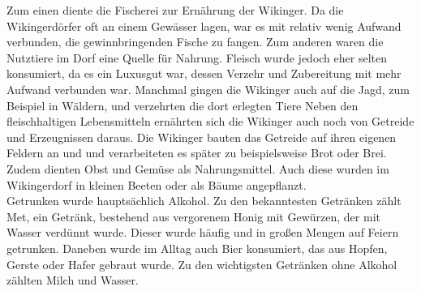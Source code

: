 \documentclass[12pt,a4paper,ngerman,openany]{book}
\begin{document}
Zum einen diente die Fischerei zur Ernährung der Wikinger. Da die Wikingerdörfer oft an einem Gewässer lagen, war es mit relativ wenig Aufwand verbunden, die gewinnbringenden Fische zu fangen. Zum anderen waren die Nutztiere im Dorf eine Quelle für Nahrung. Fleisch wurde jedoch eher selten konsumiert, da es ein Luxusgut war, dessen Verzehr und Zubereitung mit mehr Aufwand verbunden war. Manchmal gingen die Wikinger auch auf die Jagd, zum Beispiel in Wäldern, und verzehrten die dort erlegten Tiere
Neben den fleischhaltigen Lebensmitteln ernährten sich die Wikinger auch noch von Getreide und Erzeugnissen daraus. Die Wikinger bauten das Getreide auf ihren eigenen Feldern an und und verarbeiteten es später zu beispielsweise Brot oder Brei. Zudem dienten Obst und Gemüse als Nahrungsmittel. Auch diese wurden im Wikingerdorf in kleinen Beeten oder als Bäume angepflanzt.\\
Getrunken wurde hauptsächlich Alkohol. Zu den bekanntesten Getränken zählt Met, ein Getränk, bestehend aus vergorenem Honig mit Gewürzen, der mit Wasser verdünnt wurde. Dieser wurde häufig und in großen Mengen auf Feiern getrunken. Daneben wurde im Alltag auch Bier konsumiert, das aus Hopfen, Gerste oder Hafer gebraut wurde. Zu den wichtigsten Getränken ohne Alkohol zählten Milch und Wasser.

\end{document}

